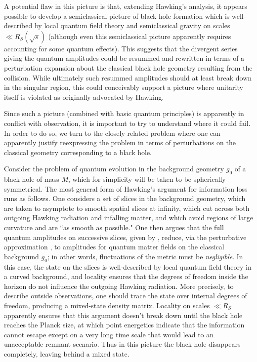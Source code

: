 A potential flaw in this picture is that, extending Hawking's analysis, it appears possible to develop a semiclassical picture of black hole formation which is well-described by local quantum field theory and semiclassical gravity on scales $\ll R_S(\sqrt s)$ (although even this semiclassical picture apparently requires accounting for some quantum effects).  This suggests that the divergent series giving the quantum amplitudes could be resummed and rewritten in terms of a perturbation expansion about the classical black hole geometry resulting from the collision.  While ultimately such resummed amplitudes should at least break down in the singular region, this could conceivably support a picture where unitarity itself is violated as originally advocated by Hawking.

Since such a picture (combined with basic quantum principles) is apparently in conflict with observation, it is important to try to understand where it could fail.  In order to do so, we turn to the closely related problem where one can apparently justify reexpressing the problem in terms of perturbations on the classical geometry corresponding to a black hole.


Consider the problem of quantum evolution in the background geometry $g_0$ of a black hole of mass $M$, which for simplicity will be taken to be spherically symmetrical.  The most general form of Hawking's argument for information loss runs as follows.  One considers a set of slices in the background geometry, which are taken to asymptote to smooth spatial slices at infinity, which cut across both outgoing Hawking radiation and infalling matter, and which avoid regions of large curvature and are  ``as smooth as possible."   One then argues that the full quantum amplitudes on successive slices, given by \gravfunc, reduce, via the perturbative approximation \gravpert, to amplitudes for quantum matter fields on the classical background $g_0$; in other words, fluctuations of the metric must be {\it negligible}.  In this case, the state on the slices is well-described by local quantum field theory in a curved background, and locality ensures that the degrees of freedom inside the horizon do not influence the outgoing Hawking radiation.  More precisely, to describe outside observations, one should trace the state over internal degrees of freedom, producing a mixed-state density matrix.  Locality on scales $\ll R_S$ apparently ensures that this argument doesn't break down until the black hole reaches the Planck size, at which point energetics indicate that the information cannot escape except on a very long time scale that would lead to an unacceptable remnant scenario.  Thus in this picture the black hole disappears completely, leaving behind a mixed state.

